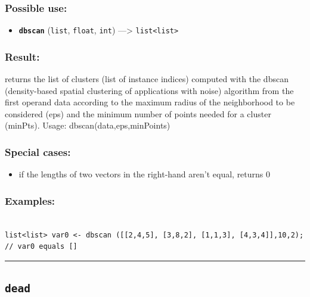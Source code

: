 \documentclass[]{book}
\providecommand{\tightlist}{%
  \setlength{\itemsep}{0pt}\setlength{\parskip}{0pt}}
\theoremstyle{definition}
\theoremstyle{definition}
\theoremstyle{definition}
\theoremstyle{remark}
\begin{document}
\subsubsection{Possible use:}\label{possible-use-125}

\begin{itemize}
\tightlist
\item
  \textbf{\texttt{dbscan}} (\texttt{list}, \texttt{float}, \texttt{int})
  ---\textgreater{} \texttt{list\textless{}list\textgreater{}}
\end{itemize}

\subsubsection{Result:}\label{result-121}

returns the list of clusters (list of instance indices) computed with
the dbscan (density-based spatial clustering of applications with noise)
algorithm from the first operand data according to the maximum radius of
the neighborhood to be considered (eps) and the minimum number of points
needed for a cluster (minPts). Usage: dbscan(data,eps,minPoints)

\subsubsection{Special cases:}\label{special-cases-49}

\begin{itemize}
\tightlist
\item
  if the lengths of two vectors in the right-hand aren't equal, returns
  0
\end{itemize}

\subsubsection{Examples:}\label{examples-95}

\begin{verbatim}
 
list<list> var0 <- dbscan ([[2,4,5], [3,8,2], [1,1,3], [4,3,4]],10,2); // var0 equals []
\end{verbatim}

\begin{center}\rule{0.5\linewidth}{\linethickness}\end{center}

\subsection{\texorpdfstring{\texttt{dead}}{dead}}\label{dead}
\end{document}
